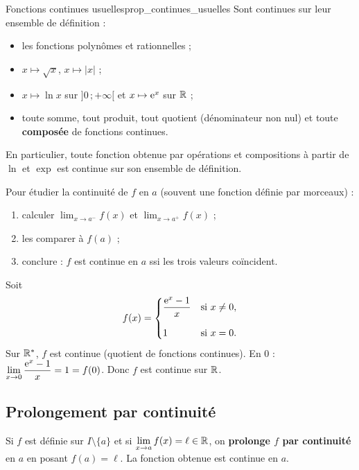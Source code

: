 \begin{propriete}{Fonctions continues usuelles}{prop_continues_usuelles}
	Sont continues sur leur ensemble de définition :
	\begin{itemize}[label=\textbullet]
		\item les fonctions polynômes et rationnelles ;
		\item $x\mapsto\sqrt{x}$, $x\mapsto|x|$ ;
		\item $x\mapsto\ln x$ sur $]0\,;+\infty[$ et $x\mapsto\mathrm{e}^x$ sur $\mathbb{R}$ ;
		\item toute somme, tout produit, tout quotient (dénominateur non nul)
		et toute \textbf{composée} de fonctions continues.
	\end{itemize}
	En particulier, toute fonction obtenue par opérations et compositions à
	partir de $\ln$ et $\exp$ est continue sur son ensemble de définition.
\end{propriete}

\begin{methode}
	Pour étudier la continuité de $f$ en $a$ (souvent une fonction définie par
	morceaux) :
	\begin{enumerate}
		\item calculer $\displaystyle\lim_{x\to a^-}f(x)$ et
		$\displaystyle\lim_{x\to a^+}f(x)$ ;
		\item les comparer à $f(a)$ ;
		\item conclure : $f$ est continue en $a$ ssi les trois valeurs coïncident.
	\end{enumerate}
\end{methode}

\begin{exemple}
	Soit
	\[
	f(x)=
	\begin{cases}
		\dfrac{\mathrm{e}^x-1}{x} & \text{si } x\neq 0,\\[1.2em]
		1 & \text{si } x=0.
	\end{cases}
	\]
	Sur $\mathbb{R}^*$, $f$ est continue (quotient de fonctions continues).
	En $0$ : $\displaystyle\lim_{x\to 0}\frac{\mathrm{e}^x-1}{x}=1=f(0)$.
	Donc $f$ est continue sur $\mathbb{R}$.
\end{exemple}

\subsection{Prolongement par continuité}

\begin{definition}
	Si $f$ est définie sur $I\setminus\{a\}$ et si
	$\displaystyle\lim_{x\to a}f(x)=\ell\in\mathbb{R}$, on \textbf{prolonge $f$ par
	continuité} en $a$ en posant $f(a)=\ell$. La fonction obtenue est continue
	en $a$.
\end{definition}

